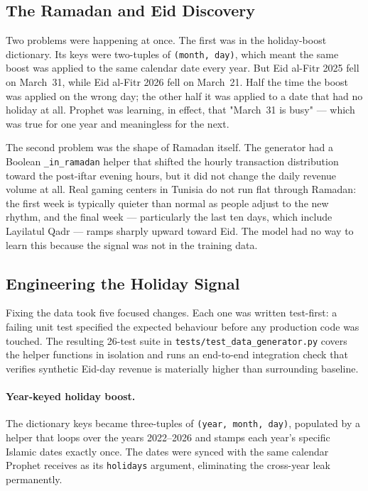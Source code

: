 \subsection{The Ramadan and Eid Discovery}

Two problems were happening at once. The first was in the holiday-boost
dictionary. Its keys were two-tuples of \texttt{(month, day)}, which meant
the same boost was applied to the same calendar date every year. But Eid al-Fitr
2025 fell on March~31, while Eid al-Fitr 2026 fell on March~21. Half the time
the boost was applied on the wrong day; the other half it was applied to a
date that had no holiday at all. Prophet was learning, in effect, that
"March~31 is busy" --- which was true for one year and meaningless for the
next.

The second problem was the shape of Ramadan itself. The generator had a
Boolean \texttt{\_in\_ramadan} helper that shifted the hourly transaction
distribution toward the post-iftar evening hours, but it did not change the
daily revenue volume at all. Real gaming centers in Tunisia do not run flat
through Ramadan: the first week is typically quieter than normal as people
adjust to the new rhythm, and the final week --- particularly the last ten
days, which include Layilatul Qadr --- ramps sharply upward toward Eid. The
model had no way to learn this because the signal was not in the training
data.

\subsection{Engineering the Holiday Signal}

Fixing the data took five focused changes. Each one was written test-first:
a failing unit test specified the expected behaviour before any production
code was touched. The resulting 26-test suite in
\texttt{tests/test\_data\_generator.py} covers the helper functions in
isolation and runs an end-to-end integration check that verifies synthetic
Eid-day revenue is materially higher than surrounding baseline.

\paragraph{Year-keyed holiday boost.} The dictionary keys became three-tuples
of \texttt{(year, month, day)}, populated by a helper that loops over the years
2022--2026 and stamps each year's specific Islamic dates exactly once. The dates
were synced with the same calendar Prophet receives as its \texttt{holidays}
argument, eliminating the cross-year leak permanently.

